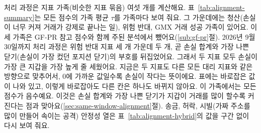 
처리 과정은 지표 가족(비슷한 지표 묶음) 여섯 개를 계산해요. 표~\ref{tab:alignment-summary}는 모든 점수의 가족 평균 $\tau$를 가족마다 보여 줘요. 그 가운데에는 청산(손실이 너무 커져 거래가 강제로 끝나는 일), 위험 반대, GMX 거래 성공 가족이 있어요. 이 세 가족은 GF-PR 참고 점수와 함께 주된 분석에서 뺐어요(\ref{sub:gf-pr}절). 2026년 9월 30일까지 처리 과정은 위험 반대 지표 세 개 가운데 두 개, 곧 손실 합계와 가장 나쁜 닫기(손실이 가장 컸던 포지션 닫기)의 부호를 뒤집었어요. 그래서 두 지표 모두 손실이 가장 큰 지갑을 가장 높게 줄 세웠어요. 지금은 두 지표도 다른 모든 대리 지표와 같은 방향으로 맞추어서, 0에 가까운 값일수록 손실이 작다는 뜻이에요. 표에는 바로잡은 값이 나와 있고, 이렇게 바로잡아도 다른 칸은 하나도 바뀌지 않아요. 이 가족에서는 모든 점수가 음수예요. 이것은 손실 합계와 가장 나쁜 닫기가 지갑이 거래를 많이 할수록 커진다는 점과 맞아요(\ref{sec:same-window-alignment}절). 송금, 허락, 시빌(가짜 주소를 많이 만들어 속이는 공격) 안정성 열은 표~\ref{tab:alignment-hybrid}의 값을 구간 없이 다시 보여 줘요.




